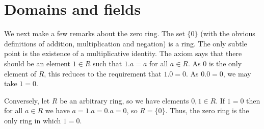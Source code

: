 \documentclass{amsart}
\renewcommand{\:}{\colon}
\theoremstyle{definition}
\begin{document}
\section{Domains and fields}

We next make a few remarks about the zero ring.  The set $\{0\}$ (with
the obvious definitions of addition, multiplication and negation) is a
ring.  The only subtle point is the existence of a multiplicative
identity.  The axiom says that there should be an element $1\in R$
such that $1.a=a$ for all $a\in R$.  As $0$ is the only element of
$R$, this reduces to the requirement that $1.0=0$.  As $0.0=0$, we may
take $1=0$.

Conversely, let $R$ be an arbitrary ring, so we have elements 
$0,1\in R$.  If $1=0$ then for all $a\in R$ we have $a=1.a=0.a=0$, so
$R=\{0\}$.  Thus, the zero ring is the only ring in which $1=0$.
\end{document}
